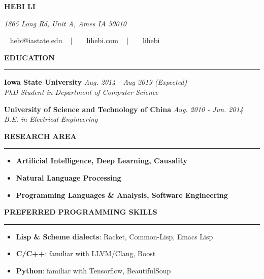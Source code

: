 \documentclass[10pt,letterpaper]{article}
\newenvironment{mysection}[1]{ %
  \medskip
  \MakeUppercase{\bf #1}
  \medskip
  \hrule
  \begin{list}{}{
      \setlength{\leftmargin}{1.5em}
    }
  \item[]
}{
  \end{list}
}
\begin{document}
\centerline{\MakeUppercase{\huge\bf Hebi Li}}
\centerline{\textit{\textcolor{mygray}{1865 Long Rd, Unit A, Ames IA
      50010}}} \centerline{\faEnvelope ~ hebi@iastate.edu ~ | ~
  \faHome ~ lihebi.com ~ | ~ \faGithubSquare ~ lihebi}

\begin{mysection}{Education}
  \textbf{Iowa State University} \hfill \emph{Aug. 2014 - Aug 2019 (Expected)} \\
  \emph{PhD Student in Department of Computer Science}

  \textbf{University of Science and Technology of China}
  \hfill \emph{Aug. 2010 - Jun. 2014} \\
  \emph{B.E. in Electrical Engineering}
\end{mysection}

\begin{mysection}{Research Area}
  \begin{itemize}
  \item \textbf{Artificial Intelligence, Deep Learning, Causality}
  \item \textbf{Natural Language Processing}
  \item \textbf{Programming Languages \& Analysis, Software Engineering}
  \end{itemize}
\end{mysection}

\begin{mysection}{Preferred Programming Skills}
  \begin{itemize}
  \item \textbf{Lisp \& Scheme dialects}: Racket, Common-Lisp, Emacs
    Lisp
  \item \textbf{C/C++}: familiar with LLVM/Clang, Boost
  \item \textbf{Python}: familiar with Tensorflow, BeautifulSoup
  \end{itemize}
\end{mysection}
\end{document}
